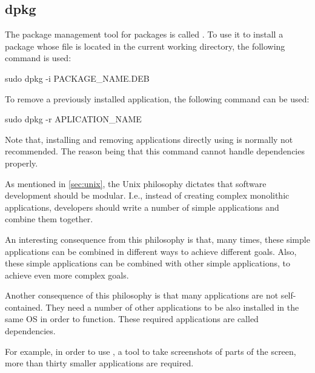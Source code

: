 \subsection{dpkg}

The package management tool for  packages is called . To use it to install a package whose  file is located in the current working directory, the following command is used:

\begin{command_line}[make]
sudo dpkg -i PACKAGE_NAME.DEB
\end{command_line}

To remove a previously installed application, the following command can be used:

\begin{command_line}[make]
sudo dpkg -r APLICATION_NAME
\end{command_line}

Note that, installing and removing applications directly using  is normally not recommended. The reason being that this command cannot handle dependencies properly.
\vspace{1cm}

\begin{my_box}[Dependencies]
\label{box:dependencies}

As mentioned in \ref{sec:unix}, the Unix philosophy dictates that software development should be modular. I.e., instead of creating complex monolithic applications, developers should write a number of simple applications and combine them together.

An interesting consequence from this philosophy is that, many times, these simple applications can be combined in different ways to achieve different goals. Also, these simple applications can be combined with other simple applications, to achieve even more complex goals.

Another consequence of this philosophy is that many applications are not self-contained. They need a number of other applications to be also installed in the same \acs{OS} in order to function. These required applications are called dependencies.

For example, in order to use , a tool to take screenshots of parts of the screen, more than thirty smaller applications are required.
\end{my_box}


